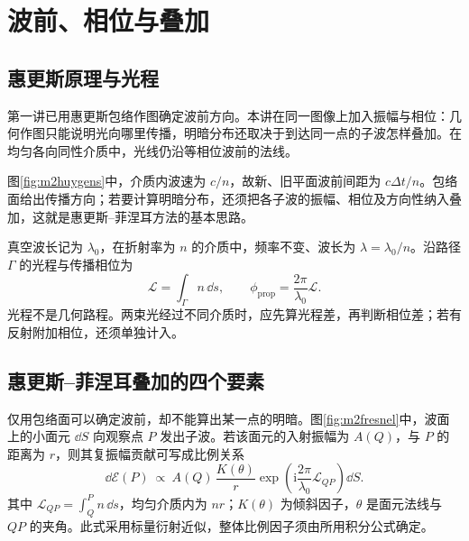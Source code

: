 \section{波前、相位与叠加}

\subsection{惠更斯原理与光程}

第一讲已用惠更斯包络作图确定波前方向。本讲在同一图像上加入振幅与相位：几何作图只能说明光向哪里传播，明暗分布还取决于到达同一点的子波怎样叠加。在均匀各向同性介质中，光线仍沿等相位波前的法线。

图\ref{fig:m2huygens}中，介质内波速为 \(c/n\)，故新、旧平面波前间距为 \(c\Delta t/n\)。包络面给出传播方向；若要计算明暗分布，还须把各子波的振幅、相位及方向性纳入叠加，这就是惠更斯--菲涅耳方法的基本思路。

真空波长记为 \(\lambda_0\)，在折射率为 \(n\) 的介质中，频率不变、波长为 \(\lambda=\lambda_0/n\)。沿路径 \(\Gamma\) 的光程与传播相位为
\[
 \mathcal L=\int_\Gamma n\,\dd s,\qquad
 \phi_{\mathrm{prop}}=\frac{2\pi}{\lambda_0}\mathcal L.
\]
光程不是几何路程。两束光经过不同介质时，应先算光程差，再判断相位差；若有反射附加相位，还须单独计入。

\subsection{惠更斯--菲涅耳叠加的四个要素}

仅用包络面可以确定波前，却不能算出某一点的明暗。图\ref{fig:m2fresnel}中，波面上的小面元 \(\dd S\) 向观察点 \(P\) 发出子波。若该面元的入射振幅为 \(A(Q)\)，与 \(P\) 的距离为 \(r\)，则其复振幅贡献可写成比例关系
\[
 \dd\mathcal E(P)\ \propto\
 A(Q)\,\frac{K(\theta)}r
 \exp\!\left(\mathrm i\frac{2\pi}{\lambda_0}\mathcal L_{QP}\right)\dd S.
\]
其中 \(\mathcal L_{QP}=\int_Q^P n\,\dd s\)，均匀介质内为 \(nr\)；\(K(\theta)\) 为倾斜因子，\(\theta\) 是面元法线与 \(QP\) 的夹角。此式采用标量衍射近似，整体比例因子须由所用积分公式确定。

